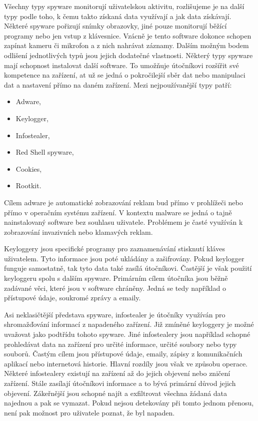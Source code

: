 Všechny typy spyware monitorují uživatelskou aktivitu, rozlišujeme je na další typy podle toho, k čemu takto získaná data využívají a jak data získávají.
Některé spyware pořizují snímky obrazovky, jiné pouze monitorují běžící programy nebo jen vstup z klávesnice.
Vzácně je tento software dokonce schopen zapínat kameru či mikrofon a z nich nahrávat záznamy.
Dalším možným bodem odlišení jednotlivých typů jsou jejich dodatečné vlastnosti.
Některý typy spyware mají schopnost instalovat další software.
To umožňuje útočníkovi rozšířit své kompetence na zařízení, at už se jedná o pokročilejší sběr dat nebo manipulaci dat a nastavení přímo na daném zařízení.
Mezi nejpoužívanější typy patří:
\begin{itemize}
	\item Adware,
	\item Keylogger,
	\item Infostealer,
	\item Red Shell spyware,
	\item Cookies,
	\item Rootkit.
\end{itemize}\cite{avast_spyware, fortinet_spyware}

Cílem adware je automatické zobrazování reklam bud přímo v prohlížeči nebo přímo v operačním systému zařízení.
V kontextu malware se jedná o tajně nainstalovaný software bez souhlasu uživatele.
Problémem je časté využíván k zobrazování invazivních nebo klamavých reklam.\cite{avast_spyware}

Keyloggery jsou specifické programy pro zaznamenávání stisknutí kláves uživatelem.
Tyto informace jsou poté ukládány a zašifrovány.
Pokud keylogger funguje samostatně, tak tyto data také zasílá útočníkovi.
Častější je však použití keyloggeru spolu s dalším spyware.
Primárním cílem útočníka jsou běžně zadávané věci, které jsou v software chráněny.
Jedná se tedy například o přístupové údaje, soukromé zprávy a emaily.\cite{avast_spyware}

Asi neklasičtější představa spyware, infostealer je útočníky využíván pro shromažďování informací z napadeného zařízení.
Již zmíněné keyloggery je možné uvažovat jako podtřídu tohoto spyware.
Jiné infostealery jsou například schopné prohledávat data na zařízení pro určité informace, určité soubory nebo typy souborů.
Častým cílem jsou přístupové údaje, emaily, zápisy z komunikačních aplikací nebo internetová historie.
Hlavní rozdíly jsou však ve způsobu operace.
Některé infostealery existují na zařízení až do jejich objevení nebo zničení zařízení.
Stále zasílají útočníkovi informace a to bývá primární důvod jejich objevení.
Zákeřnější jsou schopné najít a exfiltrovat všechna žádaná data najednou a pak se vymazat.
Pokud nejsou detekovány při tomto jednom přenosu, není pak možnost pro uživatele poznat, že byl napaden.\cite{avast_spyware}

